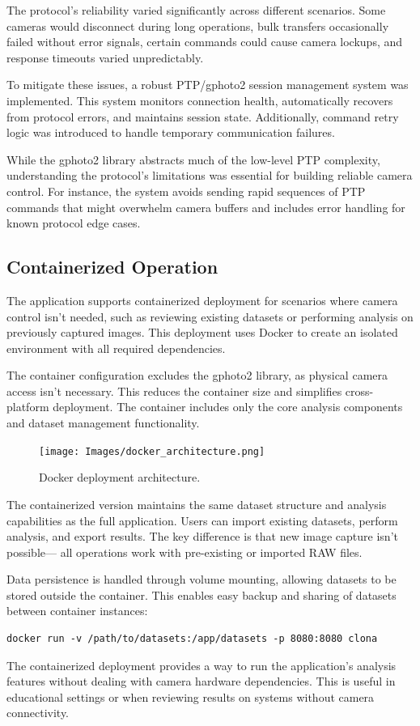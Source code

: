 The protocol's reliability varied significantly across different scenarios. Some cameras would disconnect during long operations, bulk transfers occasionally failed without error signals, certain commands could cause camera lockups, and response timeouts varied unpredictably.

To mitigate these issues, a robust PTP/gphoto2 session management system was implemented. This system monitors connection health, automatically recovers from protocol errors, and maintains session state. Additionally, command retry logic was introduced to handle temporary communication failures.

While the gphoto2 library abstracts much of the low-level PTP complexity, understanding the protocol's limitations was essential for building reliable camera control. For instance, the system avoids sending rapid sequences of PTP commands that might overwhelm camera buffers and includes error handling for known protocol edge cases.

\subsection{Containerized Operation}

The application supports containerized deployment for scenarios where camera control isn't needed, such as reviewing existing datasets or performing analysis on previously captured images. This deployment uses Docker to create an isolated environment with all required dependencies.

The container configuration excludes the gphoto2 library, as physical camera access isn't necessary. This reduces the container size and simplifies cross-platform deployment. The container includes only the core analysis components and dataset management functionality.

\begin{figure}[h]
\centering
\texttt{[image: Images/docker\_architecture.png]}
\caption{Docker deployment architecture.}
\label{fig:docker_architecture}
\end{figure}

The containerized version maintains the same dataset structure and analysis capabilities as the full application. Users can import existing datasets, perform analysis, and export results. The key difference is that new image capture isn't possible— all operations work with pre-existing or imported RAW files.

Data persistence is handled through volume mounting, allowing datasets to be stored outside the container. This enables easy backup and sharing of datasets between container instances:

\begin{verbatim}
docker run -v /path/to/datasets:/app/datasets -p 8080:8080 clona
\end{verbatim}

The containerized deployment provides a way to run the application's analysis features without dealing with camera hardware dependencies. This is useful in educational settings or when reviewing results on systems without camera connectivity.
